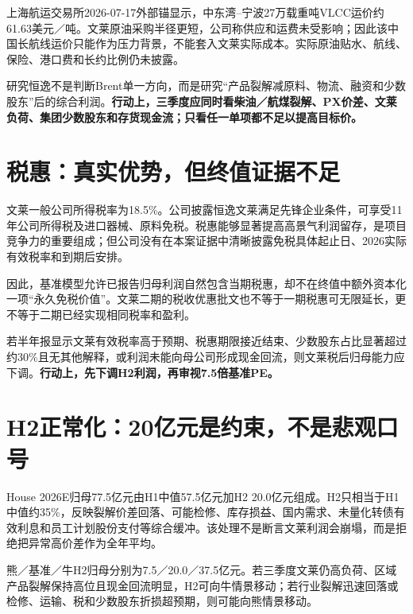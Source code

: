 上海航运交易所2026-07-17外部锚显示，中东湾--宁波27万载重吨VLCC运价约61.63美元／吨。文莱原油采购半径更短，公司称供应和运费未受影响；因此该中国长航线运价只能作为压力背景，不能套入文莱实际成本。实际原油贴水、航线、保险、港口费和长约比例仍未披露。

\begin{keyinsight}
研究恒逸不是判断Brent单一方向，而是研究“产品裂解减原料、物流、融资和少数股东”后的综合利润。\textbf{行动上，三季度应同时看柴油／航煤裂解、PX价差、文莱负荷、集团少数股东和存货现金流；只看任一单项都不足以提高目标价。}
\end{keyinsight}

\section{税惠：真实优势，但终值证据不足}

文莱一般公司所得税率为18.5\%。公司披露恒逸文莱满足先锋企业条件，可享受11年公司所得税及进口器械、原料免税。税惠能够显著提高高景气利润留存，是项目竞争力的重要组成；但公司没有在本案证据中清晰披露免税具体起止日、2026实际有效税率和到期后安排。

因此，基准模型允许已报告归母利润自然包含当期税惠，却不在终值中额外资本化一项“永久免税价值”。文莱二期的税收优惠批文也不等于一期税惠可无限延长，更不等于二期已经实现相同税率和盈利。

\begin{riskbox}[税惠与归属失效条件]
若半年报显示文莱有效税率高于预期、税惠期限接近结束、少数股东占比显著超过约30\%且无其他解释，或利润未能向母公司形成现金回流，则文莱税后归母能力应下调。\textbf{行动上，先下调H2利润，再审视7.5倍基准PE。}
\end{riskbox}

\section{H2正常化：20亿元是约束，不是悲观口号}

House 2026E归母77.5亿元由H1中值57.5亿元加H2 20.0亿元组成。H2只相当于H1中值约35\%，反映裂解价差回落、可能检修、库存损益、国内需求、未量化转债有效利息和员工计划股份支付等综合缓冲。该处理不是断言文莱利润会崩塌，而是拒绝把异常高价差作为全年平均。

熊／基准／牛H2归母分别为7.5／20.0／37.5亿元。若三季度文莱仍高负荷、区域产品裂解保持高位且现金回流明显，H2可向牛情景移动；若行业裂解迅速回落或检修、运输、税和少数股东折损超预期，则可能向熊情景移动。

